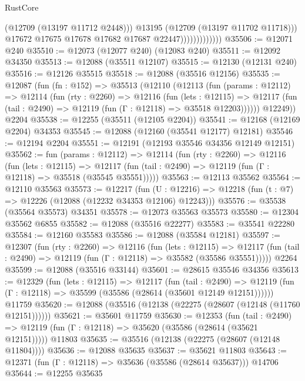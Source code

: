 \begin{lexlean}{RustCore}
\begin{coremodule}
                                  (@12709 (@13197 @11712 @2448)))
                                @13195
                                (@12709 (@13197 @11702 @11718)))
                              @17672
                              @17675
                              @17678
                              @17682
                              @17687
                              @22447)))))))))))))
@35506 := @12071 @240
@35510 := @12073 (@12077 @240) (@12083 @240)
@35511 := @12092 @34350
@35513 := @12088 (@35511 @12107)
@35515 := @12130 (@12131 @240)
@35516 := @12126 @35515
@35518 := @12088 (@35516 @12156)
@35535 := @12087
    (fun (fn : @152) =>
    @35513
      (@12110
        (@12113
          (fun (params : @12112) =>
          @12114
            (fun (rty : @2260) =>
            @12116
              (fun (lets : @12115) =>
              @12117 (fun (tail : @2490) => @12119 (fun (Γ : @12118) => @35518 @12203))))))
        @12249))
    @2204
@35538 := @12255 (@35511 (@12105 @2204))
@35541 := @12168 (@12169 @2204) @34353
@35545 := @12088 (@12160 (@35541 @12177) @12181)
@35546 := @12194 @2204
@35551 := @12191 (@12193 @35546 @34356 @12149 @12151)
@35562 := fun (params : @12112) =>
  @12114
    (fun (rty : @2260) =>
    @12116
      (fun (lets : @12115) =>
      @12117 (fun (tail : @2490) => @12119 (fun (Γ : @12118) => @35518 (@35545 @35551)))))
@35563 := @12113 @35562
@35564 := @12110 @35563
@35573 := @12217
    (fun (U : @12216) => @12218 (fun (t : @7) => @12226 (@12088 (@12232 @34353 @12106) @12243)))
@35576 := @35538 (@35564 @35573) @34351
@35578 := @12073 @35563 @35573
@35580 := @12304 @35562 @6855
@35582 := @12088 (@35516 @22277)
@35583 := @35541 @22280
@35584 := @12160 @35583
@35586 := @12088 (@35584 @12181)
@35597 := @12307
    (fun (rty : @2260) =>
    @12116
      (fun (lets : @12115) =>
      @12117 (fun (tail : @2490) => @12119 (fun (Γ : @12118) => @35582 (@35586 @35551)))))
    @2264
@35599 := @12088 (@35516 @33144)
@35601 := @28615 @35546 @34356
@35613 := @12329
    (fun (lets : @12115) =>
    @12117
      (fun (tail : @2490) =>
      @12119 (fun (Γ : @12118) => @35599 (@35586 (@28614 (@35601 @12149 @12151))))))
    @11759
@35620 := @12088 (@35516 (@12138 (@22275 (@28607 (@12148 (@11760 @12151))))))
@35621 := @35601 @11759
@35630 := @12353
    (fun (tail : @2490) => @12119 (fun (Γ : @12118) => @35620 (@35586 (@28614 (@35621 @12151)))))
    @11803
@35635 := @35516 (@12138 (@22275 (@28607 (@12148 @11804))))
@35636 := @12088 @35635
@35637 := @35621 @11803
@35643 := @12371 (fun (Γ : @12118) => @35636 (@35586 (@28614 @35637))) @14706
@35644 := @12255 @35635

\end{coremodule}
\end{lexlean}

